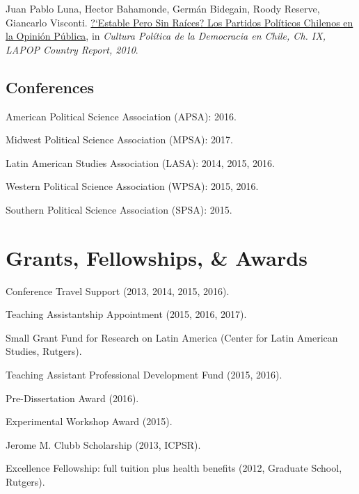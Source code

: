 \documentclass[letterpaper]{article}
\renewenvironment{itemize}{
  \begin{list}{}{
    \setlength{\leftmargin}{1.5em}
  }
}{
  \end{list}
}
\begin{document}
\begin{itemize}
\item Juan Pablo Luna, Hector Bahamonde, Germ\'an Bidegain, Roody Reserve, Giancarlo Visconti. \href{http://www.vanderbilt.edu/lapop/chile/Chile-2010-cultura-politica.pdf}{?`Estable Pero Sin Ra\'ices? Los Partidos Pol\'iticos Chilenos en la Opini\'on P\'ublica}, in \emph{Cultura Pol\'itica de la Democracia en Chile, Ch. IX, LAPOP Country Report, 2010}.
\end{itemize}

\subsection*{Conferences}

\begin{itemize}
\item American Political Science Association (APSA): 2016.
\item Midwest Political Science Association (MPSA): 2017.
\item Latin American Studies Association (LASA): 2014, 2015, 2016.
\item Western Political Science Association (WPSA): 2015, 2016.
\item Southern Political Science Association (SPSA): 2015.
\end{itemize}


\section*{Grants, Fellowships, \& Awards}

\begin{itemize}
\item Conference Travel Support (2013, 2014, 2015, 2016).
\item Teaching Assistantship Appointment (2015, 2016, 2017).
\item Small Grant Fund for Research on Latin America (Center for Latin American Studies, Rutgers).
\item Teaching Assistant Professional Development Fund (2015, 2016).
\item Pre-Dissertation Award (2016).
\item Experimental Workshop Award (2015).
\item Jerome M. Clubb Scholarship (2013, ICPSR).
\item Excellence Fellowship: full tuition plus health benefits (2012, Graduate School, Rutgers).
\end{itemize}
\end{document}

